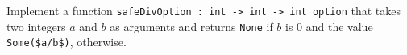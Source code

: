 Implement a function \lstinline{safeDivOption : int -> int -> int option} that takes two integers $a$ and $b$ as arguments and returns
\lstinline{None} if $b$ is 0 and the value
\lstinline[mathescape]{Some($a/b$)}, otherwise.

